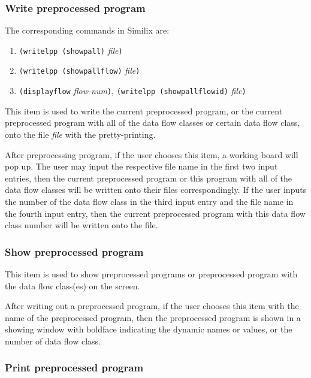 \begin{sloppypar}
\subsubsection{Write preprocessed program}
\label{subsubsec-write-pre-prog}

The corresponding commands in Similix are:

\begin{enumerate}
\item {\tt (writelpp (showpall)} {\it file}{\tt )}
\item {\tt (writelpp (showpallflow)} {\it file}{\tt )}
\item {\tt (displayflow} {\it flow-num}{\tt )},
      {\tt (writelpp (showpallflowid)} {\it file}{\tt )}
\end{enumerate}

This item is used to write the current preprocessed program, or the
current preprocessed program with all of the data flow classes or
certain data flow class, onto the file {\it file} with the
pretty-printing.

After preprocessing program, if the user chooses this item, a working
board will pop up.  The user may input the respective file name in the
first two input entries, then the current preprocessed program or this
program with all of the data flow classes will be written onto their
files correspondingly.  If the user inputs the number of the data flow
class in the third input entry and the file name in the fourth input
entry, then the current preprocessed program with this data flow class
number will be written onto the file.


\subsubsection{Show preprocessed program}
\label{subsubsec-show-pre-prog}

This item is used to show preprocessed programs or preprocessed
program with the data flow class(es) on the screen.

After writing out a preprocessed program, if the user chooses this
item with the name of the preprocessed program, then the preprocessed
program is shown in a showing window with boldface indicating the
dynamic names or values, or the number of data flow class.


\subsubsection{Print preprocessed program}
\label{subsubsec-print-pre-prog}


\end{sloppypar}
